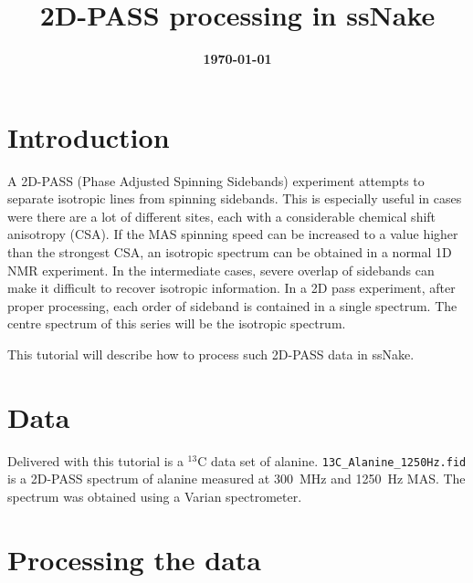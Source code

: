 \documentclass[11pt,a4paper]{article}
\title{\color{black}\fontfamily{SourceSansPro-LF}\bfseries 2D-PASS processing in ssNake}
\author{}
\date{\color{black}\fontfamily{SourceSansPro-LF}\bfseries \today}
\begin{document}

\maketitle

\section{Introduction}
A 2D-PASS (Phase Adjusted Spinning Sidebands) experiment attempts to separate isotropic lines from
spinning sidebands. This is especially useful in cases were there are a lot of different sites, each
with a considerable chemical shift anisotropy (CSA). If the MAS spinning speed can be increased to a
value higher than the strongest CSA, an isotropic spectrum can be obtained in a normal 1D NMR
experiment. In the intermediate cases, severe overlap of sidebands can make it difficult to recover
isotropic information. In a 2D pass experiment, after proper processing, each order of sideband is
contained in a single spectrum. The centre spectrum of this series will be the isotropic spectrum.

This tutorial will describe how to process such 2D-PASS data in ssNake.



\section{Data}
Delivered with this tutorial is a $^{13}$C data set of alanine.
\texttt{13C\_Alanine\_1250Hz.fid} is a 2D-PASS spectrum of alanine measured at \SI{300}{\MHz} and
\SI{1250}{\Hz} MAS. The spectrum was obtained using a Varian spectrometer.



\section{Processing the data}
\end{document}
